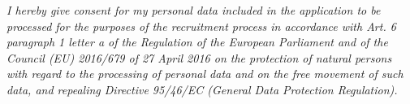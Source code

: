 \documentclass[10pt,a4paper,ragged2e,withhyper]{altacv}
\begin{document}
\vspace{16pt}

\small\textit{I hereby give consent for my personal data included in the application to be processed for the purposes of the recruitment process in accordance with Art. 6 paragraph 1 letter a of the Regulation of the European Parliament and of the Council (EU) 2016/679 of 27 April 2016 on the protection of natural persons with regard to the processing of personal data and on the free movement of such data, and repealing Directive 95/46/EC (General Data Protection Regulation).}
\end{document}
